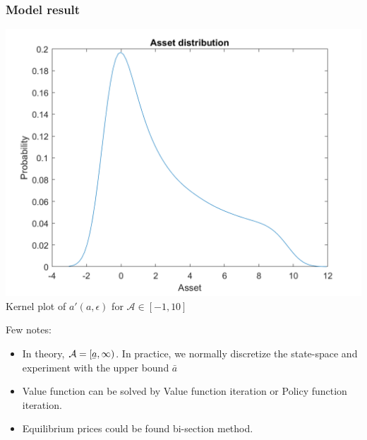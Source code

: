 \documentclass{beamer}
\newcommand{\ubar}[1]{\underaccent{\bar}{#1}}
\begin{document}
\begin{frame}
\frametitle{Model result}
\begin{center}
\includegraphics[scale=0.3]{graph.png} \\
Kernel plot of $a'(a,\epsilon)$ for $\mathcal{A} \in [-1,10]$
\end{center}
\end{frame}

\begin{frame}
Few notes: 
\begin{itemize}
	\item In theory, $\mathcal{A} = [\ubar{a},\infty)$. In practice, we normally discretize the state-space and experiment with the upper bound $\bar{a}$
	\item Value function can be solved by Value function iteration or Policy function iteration. 
	\item Equilibrium prices could be found bi-section method. 
\end{itemize}
\end{frame}
\end{document}
